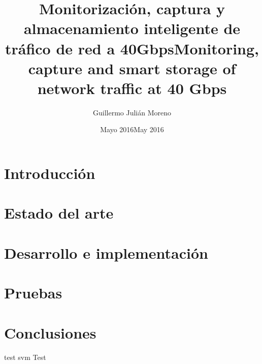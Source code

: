 \documentclass[draft, oneside]{epstfg}
\title[spa]{Monitorización, captura y almacenamiento inteligente de tráfico de red a 40Gbps}
\title[eng]{Monitoring, capture and smart storage of network traffic at 40 Gbps}
\author{Guillermo Julián Moreno}
\date[spa]{Mayo 2016}
\date[eng]{May 2016}
\begin{document}

\frontmatter

\maketitle[spa]
\maketitle[eng]

\makeinnertitle[spa]
\makeinnertitle[eng]

\makeabstract[spa]
\makeabstract[eng]

\tableofcontents
\clearpage
\listoftables
\clearpage
\listoffigures
\cleardoublepage

\mainmatter

\chapter{Introducción}

\lipsum[1-20]

\chapter{Estado del arte}

\chapter{Desarrollo e implementación}

\chapter{Pruebas}

\chapter{Conclusiones}

 \gls{test} \gls{svm} Test

\appendix

\printnoidxglossaries
\cleardoublepage

\nocite{*}
{}

\cleardoublepage
\printindex
\end{document}
